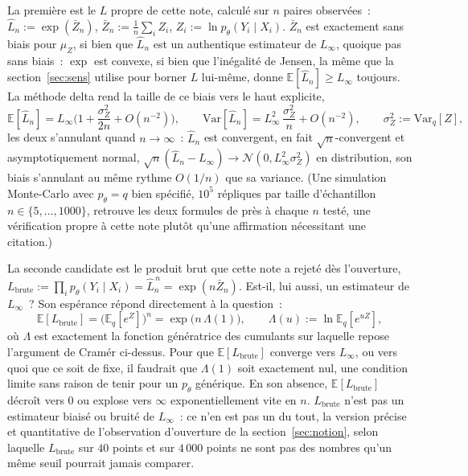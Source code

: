 \documentclass[11pt]{article}
\begin{document}
La première est le $L$ propre de cette note, calculé sur $n$ paires
observées~: $\hat L_n := \exp(\bar Z_n)$, $\bar Z_n := \frac1n\sum_i
Z_i$, $Z_i := \ln p_\theta(Y_i \mid X_i)$. $\bar Z_n$ est exactement
sans biais pour $\mu_Z$, si bien que $\hat L_n$ est un authentique
estimateur de $L_\infty$, quoique pas sans biais~: $\exp$ est convexe,
si bien que l'inégalité de Jensen, la même que la section~\ref{sec:sens}
utilise pour borner $L$ lui-même, donne $\mathbb E[\hat L_n] \ge
L_\infty$ toujours. La méthode delta rend la taille de ce biais vers le
haut explicite,
$$\mathbb E[\hat L_n] = L_\infty\Big(1 + \frac{\sigma_Z^2}{2n} +
O(n^{-2})\Big), \qquad \mathrm{Var}[\hat L_n] = L_\infty^2\,
\frac{\sigma_Z^2}{n} + O(n^{-2}), \qquad \sigma_Z^2 :=
\mathrm{Var}_q[Z],$$
les deux s'annulant quand $n \to \infty$~: $\hat L_n$ est convergent,
en fait $\sqrt n$-convergent et asymptotiquement normal, $\sqrt n(\hat
L_n - L_\infty) \to \mathcal N(0, L_\infty^2\sigma_Z^2)$ en
distribution, son biais s'annulant au même rythme $O(1/n)$ que sa
variance. (Une simulation Monte-Carlo avec $p_\theta = q$ bien
spécifié, $10^5$ répliques par taille d'échantillon $n \in
\{5,\dots,1000\}$, retrouve les deux formules de près à chaque $n$
testé, une vérification propre à cette note plutôt qu'une affirmation
nécessitant une citation.)

La seconde candidate est le produit brut que cette note a rejeté dès
l'ouverture, $L_{\text{brute}} := \prod_i p_\theta(Y_i \mid X_i) = \hat
L_n^{\,n} = \exp(n\bar Z_n)$. Est-il, lui aussi, un estimateur de
$L_\infty$~? Son espérance répond directement à la question~:
$$\mathbb E[L_{\text{brute}}] = \big(\mathbb E_q[e^Z]\big)^n =
\exp\!\big(n\,\Lambda(1)\big), \qquad \Lambda(u) := \ln \mathbb
E_q[e^{uZ}],$$
où $\Lambda$ est exactement la fonction génératrice des cumulants sur
laquelle repose l'argument de Cram\'er ci-dessus. Pour que $\mathbb
E[L_{\text{brute}}]$ converge vers $L_\infty$, ou vers quoi que ce soit
de fixe, il faudrait que $\Lambda(1)$ soit exactement nul, une
condition limite sans raison de tenir pour un $p_\theta$ générique. En
son absence, $\mathbb E[L_{\text{brute}}]$ décroît vers $0$ ou explose
vers $\infty$ exponentiellement vite en $n$. $L_{\text{brute}}$ n'est
pas un estimateur biaisé ou bruité de $L_\infty$~: ce n'en est pas un
du tout, la version précise et quantitative de l'observation
d'ouverture de la section~\ref{sec:notion}, selon laquelle
$L_{\text{brute}}$ sur $40$ points et sur $4\,000$ points ne sont pas
des nombres qu'un même seuil pourrait jamais comparer.
\end{document}
